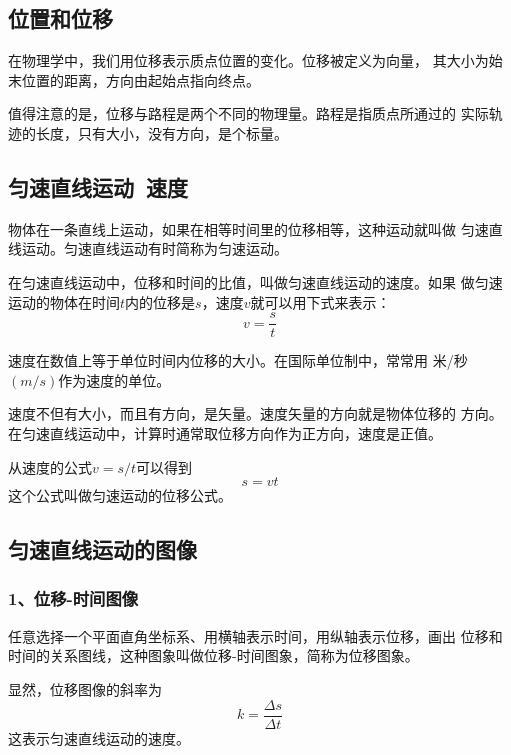 \subsection{位置和位移}
\begin{definition}
    在物理学中，我们用位移表示质点位置的变化。位移被定义为向量，
    其大小为始末位置的距离，方向由起始点指向终点。
\end{definition}

值得注意的是，位移与路程是两个不同的物理量。路程是指质点所通过的
实际轨迹的长度，只有大小，没有方向，是个标量。
\subsection{匀速直线运动~速度}
\begin{definition}
    物体在一条直线上运动，如果在相等时间里的位移相等，这种运动就叫做
    匀速直线运动。匀速直线运动有时简称为匀速运动。
\end{definition}

\begin{definition}
    在匀速直线运动中，位移和时间的比值，叫做匀速直线运动的速度。如果 
    做匀速运动的物体在时间$t$内的位移是$s$，速度$v$就可以用下式来表示：
    \begin{equation}
        v=\frac{s}{t}
    \end{equation}
\end{definition}
速度在数值上等于单位时间内位移的大小。在国际单位制中，常常用
米/秒$(m/s)$作为速度的单位。

速度不但有大小，而且有方向，是矢量。速度矢量的方向就是物体位移的
方向。在匀速直线运动中，计算时通常取位移方向作为正方向，速度是正值。

从速度的公式$v=s/t$可以得到 
\begin{equation}
    s=vt
\end{equation}
这个公式叫做匀速运动的位移公式。
\subsection{匀速直线运动的图像}
\subsubsection*{1、位移-时间图像}
任意选择一个平面直角坐标系、用横轴表示时间，用纵轴表示位移，画出
位移和时间的关系图线，这种图象叫做位移-时间图象，简称为位移图象。

显然，位移图像的斜率为
\begin{equation}
    k=\frac{\Delta s}{\Delta t}
\end{equation}
这表示匀速直线运动的速度。
